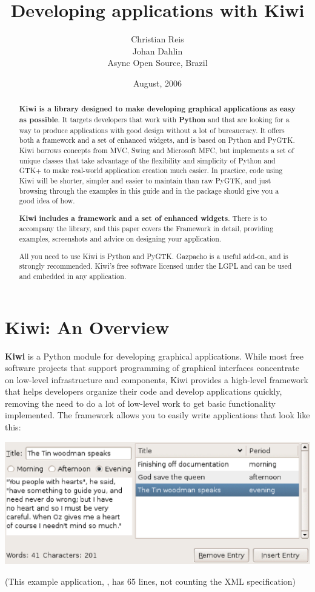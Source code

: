 \documentclass[a4paper]{howto}
\title{Developing applications with Kiwi}
\author{Christian Reis\\Johan Dahlin\\Async Open Source, Brazil}
\date{August, 2006}
\begin{document}

\begin{abstract}
\noindent
{\bf Kiwi is a library designed to make developing graphical
applications as easy as possible}. It targets developers that work with
{\bf Python} and that are looking for a way to produce applications with
good design without a lot of bureaucracy.  It offers both a framework
and a set of enhanced widgets, and is based on Python and PyGTK. Kiwi
borrows concepts from MVC, Swing and Microsoft MFC, but implements a set
of unique classes that take advantage of the flexibility and simplicity
of Python and GTK+ to make real-world application creation much easier.
In practice, code using Kiwi will be shorter, simpler and easier to
maintain than raw PyGTK, and just browsing through the examples in this
guide and in the package should give you a good idea of how.

{\bf Kiwi includes a framework and a set of enhanced widgets}. There is
 to accompany the library, and this paper covers the
Framework in detail, providing examples, screenshots and advice on
designing your application.

All you need to use Kiwi is Python and PyGTK. Gazpacho is a useful add-on,
and is strongly recommended. Kiwi's free software licensed under the LGPL
and can be used and embedded in any application.
\end{abstract}

\section{Kiwi: An Overview}

\textbf{Kiwi} is a Python module for developing graphical applications.
While most free software projects that support programming of graphical
interfaces concentrate on low-level infrastructure and components, Kiwi
provides a high-level framework that helps developers organize their
code and develop applications quickly, removing the need to do a lot of
low-level work to get basic functionality implemented. The framework
allows you to easily write applications that look like this:

\begin{center}
\includegraphics[scale=0.626]{images/diary.eps}

\small{(This example application, , has
65 lines, not counting the XML specification)}
\end{center}
\end{document}
